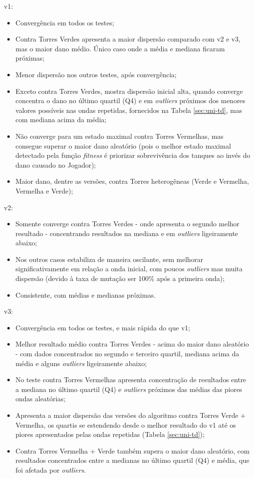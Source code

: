 v1:
\begin{itemize}
  \item Convergência em todos os testes;
  \item Contra Torres Verdes apresenta a maior dispersão comparado com v2 e v3, mas o maior dano médio. Único caso onde a média e mediana ficaram próximas;
  \item Menor dispersão nos outros testes, após convergência;
  \item Exceto contra Torres Verdes, mostra dispersão inicial alta, quando converge concentra o dano no último quartil (Q4) e em \textit{outliers} próximos dos menores valores possíveis nas ondas repetidas, fornecidos na Tabela \ref{sec:uni-td}, mas com mediana acima da média;
  \item Não converge para um estado maximal contra Torres Vermelhas, mas consegue superar o maior dano aleatório (pois o melhor estado maximal detectado pela função \textit{fitness} é priorizar sobrevivência dos tanques ao invés do dano causado no Jogador);
  \item Maior dano, dentre as versões, contra Torres heterogêneas (Verde e Vermelha, Vermelha e Verde);
\end{itemize}

\pagebreak

v2:
\begin{itemize}
  \item Somente converge contra Torres Verdes - onde apresenta o segundo melhor resultado - concentrando resultados na mediana e em \textit{outliers} ligeiramente abaixo;
  \item Nos outros casos estabiliza de maneira oscilante, sem melhorar significativamente em relação a onda inicial, com poucos  \textit{outliers} mas muita dispersão (devido à taxa de mutação ser 100\% após a primeira onda);
  \item Consistente, com médias e medianas próximas.
\end{itemize}

v3:
\begin{itemize}
  \item Convergência em todos os testes, e mais rápida do que v1;
  \item Melhor resultado médio contra Torres Verdes - acima do maior dano aleatório - com dados concentrados no segundo e terceiro quartil, mediana acima da média e alguns \textit{outliers} ligeiramente abaixo;
  \item No teste contra Torres Vermelhas apresenta concentração de resultados entre a mediana no último quartil (Q4) e \textit{outliers} próximos das médias das piores ondas aleatórias;
  \item Apresenta a maior dispersão das versões do algoritmo contra Torres Verde + Vermelha, os quartis se estendendo desde o melhor resultado do v1 até os piores apresentados pelas ondas repetidas (Tabela \ref{sec:uni-td});
  \item Contra Torres Vermelha + Verde também supera o maior dano aleatório, com resultados concentrados entre a medianas no último quartil (Q4) e média, que foi afetada por \textit{outliers}.
\end{itemize}

